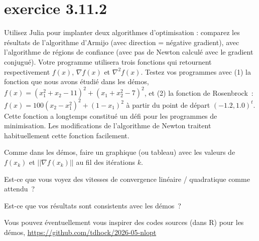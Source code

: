 \documentclass[12pt]{article}
\begin{document}
\section{exercice 3.11.2}

Utilisez Julia pour implanter deux algorithmes d’optimisation : comparez les résultats de l'algorithme d'Armijo (avec direction = négative gradient), avec l’algorithme de régions de confiance (avec pas de Newton calculé avec le gradient conjugué).
Votre programme utilisera trois fonctions qui retournent respectivement $f(x)$, $\nabla f(x)$ et $\nabla^2f(x)$.
Testez vos programmes avec (1) la fonction que nous avons étudié dans les démos, $f(x)=(x_1^2 + x_2 - 11)^2 + (x_1+x_2^2-7)^2$, et (2) la fonction de Rosenbrock : $f(x)=100(x_2-x_1^2)^2 + (1-x_1)^2$ à partir du point de départ $(-1.2,1.0)^t$. Cette fonction a longtemps constitué un défi pour les programmes de minimisation. Les modifications de l'algorithme de Newton traitent habituellement cette fonction facilement.

Comme dans les démos, faire un graphique (ou tableau) avec les valeurs de $f(x_k)$ et $||\nabla f(x_k)||$ au fil des itérations $k$.

Est-ce que vous voyez des vitesses de convergence linéaire / quadratique comme attendu ?

Est-ce que vos résultats sont consistents avec les démos ?

Vous pouvez éventuellement vous inspirer des codes sources (dans R) pour les démos,
\url{https://github.com/tdhock/2026-05-nlopt}
\end{document}
